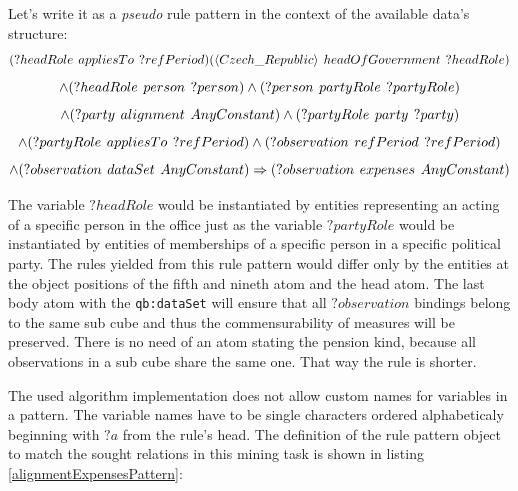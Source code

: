 Let's write it as a \textit{pseudo} rule pattern in the context of the available data's structure:
$$
(?headRole\hspace{0.4em}appliesTo\hspace{0.4em}?refPeriod) (\langle Czech\_Republic\rangle\hspace{0.4em}headOfGovernment\hspace{0.4em}?headRole) 
$$
$$
\land (?headRole\hspace{0.4em}person\hspace{0.4em}?person) \land (?person\hspace{0.4em}partyRole\hspace{0.4em}?partyRole) 
$$
$$
\land (?party\hspace{0.4em}alignment\hspace{0.4em}AnyConstant) \land (?partyRole\hspace{0.4em}party\hspace{0.4em}?party) 
$$
$$
\land (?partyRole\hspace{0.4em}appliesTo\hspace{0.4em}?refPeriod) \land (?observation\hspace{0.4em}refPeriod\hspace{0.4em}?refPeriod)
$$
$$
\land (?observation\hspace{0.4em}dataSet\hspace{0.4em}AnyConstant) \Rightarrow (?observation\hspace{0.4em}expenses\hspace{0.4em}AnyConstant)
$$

The variable $?headRole$ would be instantiated by entities representing an acting of a specific person in the office just as the variable $?partyRole$ would be instantiated by entities of memberships of a specific person in a specific political party. The rules yielded from this rule pattern would differ only by the entities at the object positions of the fifth and nineth atom and the head atom. The last body atom with the \verb|qb:dataSet| will ensure that all $?observation$ bindings belong to the same sub cube and thus the commensurability of measures will be preserved. There is no need of an atom stating the pension kind, because all observations in a sub cube share the same one. That way the rule is shorter.

The used algorithm implementation does not allow custom names for variables in a pattern. The variable names have to be single characters ordered alphabeticaly beginning with $?a$ from the rule's head. The definition of the rule pattern object to match the sought relations in this mining task is shown in listing \ref{alignmentExpensesPattern}:

